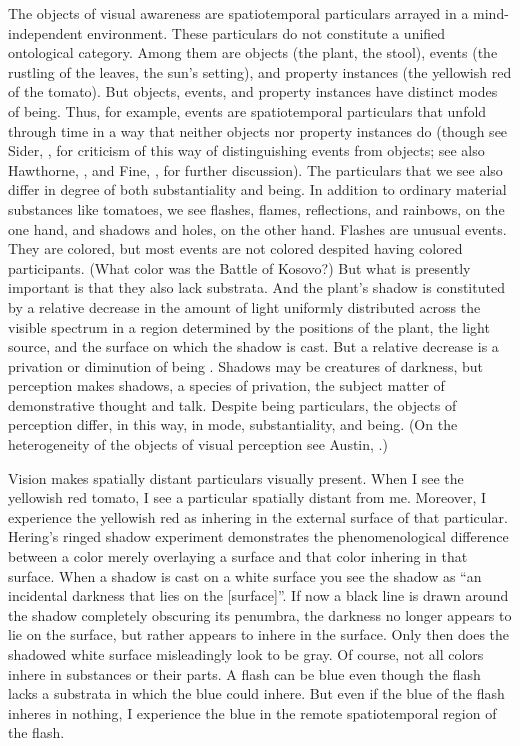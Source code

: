 \documentclass[12pt]{article}
\begin{document}
The objects of visual awareness are spatiotemporal particulars arrayed in a mind-independent environment. These particulars do not constitute a unified ontological category. Among them are objects (the plant, the stool), events (the rustling of the leaves, the sun's setting), and property instances (the yellowish red of the tomato). But objects, events, and property instances have distinct modes of being. Thus, for example, events are spatiotemporal particulars that unfold through time in a way that neither objects nor property instances do (though see Sider, \citeyear{Sider:1997fk}, for criticism of this way of distinguishing events from objects; see also Hawthorne, \citeyear{Hawthorne:2008uq}, and Fine, \citeyear{Fine:2006fk}, for further discussion). The particulars that we see also differ in degree of both substantiality and being. In addition to ordinary material substances like tomatoes, we see flashes, flames, reflections, and rainbows, on the one hand, and shadows and holes, on the other hand. Flashes are unusual events. They are colored, but most events are not colored despited having colored participants. (What color was the Battle of Kosovo?) But what is presently important is that they also lack substrata. And the plant's shadow is constituted by a relative decrease in the amount of light uniformly distributed across the visible spectrum in a region determined by the positions of the plant, the light source, and the surface on which the shadow is cast. But a relative decrease is a privation or diminution of being \citep[see][]{Sorensen:2008kx}. Shadows may be creatures of darkness, but perception makes shadows, a species of privation, the subject matter of demonstrative thought and talk. Despite being particulars, the objects of perception differ, in this way, in mode, substantiality, and being. (On the heterogeneity of the objects of visual perception see Austin, \citeyear{Austin:1962lr}.)

Vision makes spatially distant particulars visually present. When I see the yellowish red tomato, I see a particular spatially distant from me. Moreover, I experience the yellowish red as inhering in the external surface of that particular. Hering's \citeyearpar[8]{Hering:1920ty} ringed shadow experiment demonstrates the phenomenological difference between a color merely overlaying a surface and that color inhering in that surface. When a shadow is cast on a white surface you see the shadow as ``an incidental darkness that lies on the [surface]''. If now a black line is drawn around the shadow completely obscuring its penumbra, the darkness no longer appears to lie on the surface, but rather appears to inhere in the surface. Only then does the shadowed white surface misleadingly look to be gray. Of course, not all colors inhere in substances or their parts. A flash can be blue even though the flash lacks a substrata in which the blue could inhere. But even if the blue of the flash inheres in nothing, I experience the blue in the remote spatiotemporal region of the flash. 
\end{document}
